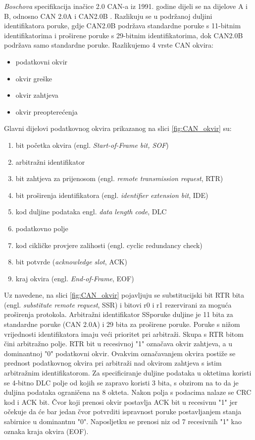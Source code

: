 \documentclass[times, utf8, diplomski, numeric]{fer}
\begin{document}
\textit{Boschova} specifikacija inačice 2.0 CAN-a iz 1991. godine dijeli se na dijelove A i B, odnosno CAN 2.0A i CAN2.0B \cite{bosch1991}. Razlikuju se u podržanoj duljini identifikatora poruke, gdje CAN2.0B podržava standardne poruke s 11-bitnim identifikatorima i proširene poruke s 29-bitnim identifikatorima, dok CAN2.0B podržava samo standardne poruke. Razlikujemo 4 vrste CAN okvira:
\begin{itemize}
    \item podatkovni okvir 
    \item okvir greške 
    \item okvir zahtjeva 
    \item okvir preopterećenja 
\end{itemize}
\newpage
Glavni dijelovi podatkovnog okvira prikazanog na slici \ref{fig:CAN_okvir} su:
\begin{enumerate}
    \item bit početka okvira (engl. \textit{Start-of-Frame bit, SOF})    
    \item arbitražni identifikator     
    \item bit zahtjeva za prijenosom (engl. \textit{remote transmission request}, RTR) 
    \item bit proširenja identifikatora (engl. \textit{identifier extension bit}, IDE) 
    \item kod duljine podataka {engl. \textit{data length code}, DLC}
    \item podatkovno polje        
    \item kod cikličke provjere zalihosti (engl. cyclic redundancy check)
    \item bit potvrde (\textit{acknowledge slot}, ACK)
    \item kraj okvira (engl. \textit{End-of-Frame}, EOF)        
\end{enumerate}

Uz navedene, na slici \ref{fig:CAN_okvir} pojavljuju se substitucijski bit RTR bita (engl. \textit{substitute remote request}, SSR) i bitovi r0 i r1 rezervirani za moguća proširenja protokola.
Arbitražni identifikator SSporuke duljine je 11 bita za standardne poruke (CAN 2.0A) i 29 bita za proširene poruke. Poruke s nižom vrijednosti identifikatora imaju veći prioritet pri arbitraži. Skupa s RTR bitom čini arbitražno polje. RTR bit u recesivnoj "1" označava okvir zahtjeva, a u dominantnoj "0" podatkovni okvir. Ovakvim označavanjem okvira postiže se prednost podatkovnog okvira pri arbitraži nad okvirom zahtjeva s istim arbitražnim identifikatorom. Za specificiranje duljine podataka u oktetima koristi se 4-bitno DLC polje od kojih se zapravo koristi 3 bita, s obzirom na to da je duljina podataka ograničena na 8 okteta. Nakon polja s podacima nalaze se CRC kod i ACK bit. Čvor koji prenosi okvir postavlja ACK bit u recesivnu "1" jer očekuje da će bar jedan čvor potvrditi ispravnost poruke postavljanjem stanja sabirnice u dominantnu "0". Naposljetku se prenosi niz od 7 recesivnih "1" kao oznaka kraja okvira (EOF).
\end{document}
